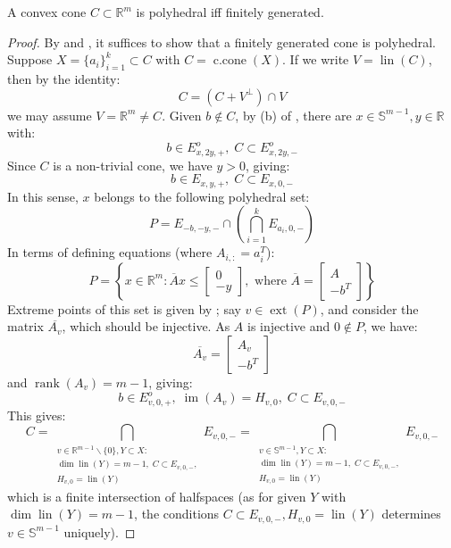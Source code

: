 \begin{prop}\label{prop:017-Minkowski-Weyl-Theorem}
	A convex cone $C\subset \mathbb{R}^m$ is polyhedral iff finitely generated.
\end{prop}
\begin{proof}
	By  and , it suffices to show that a finitely generated cone is polyhedral. Suppose $X=\{a_i\}_{i=1}^{k}\subset C$ with $C=\operatorname{c.cone}(X)$. If we write $V=\operatorname{lin}(C)$, then by the identity:
	\[
		C=(C+V^\perp)\cap V
	\]
	we may assume $V=\mathbb{R}^m\neq C$. Given $b\notin C$, by (b) of , there are $x\in \mathbb{S}^{m-1},y\in \mathbb{R}$ with:
	\[
		b\in E_{x,2y,+}^o,\; C\subset E_{x,2y,-}^o
	\]
	Since $C$ is a non-trivial cone, we have $y>0$, giving:
	\[
		b\in E_{x,y,+},\; C\subset E_{x,0,-}
	\]
	In this sense, $x$ belongs to the following polyhedral set:
	\[
		P = E_{-b,-y,-}\cap\left(\bigcap_{i=1}^k E_{a_i,0,-}\right)
	\]
	In terms of defining equations (where $A_{i,:}=a_i^T$):
	\[
		P=
		\left\{x\in \mathbb{R}^m:\overline{A}x\leq
		\left[
			\begin{array}{r}
				0 \\\hline
				-y
			\end{array}
			\right]
		,\text{ where }
		\overline{A}=\left[
			\begin{array}{r}
				A \\\hline
				-b^T
			\end{array}
			\right]
		\right\}
	\]
	Extreme points of this set is given by ; say $v\in \operatorname{ext}(P)$, and consider the matrix $\overline{A_v}$, which should be injective. As $A$ is injective and $0\notin P$, we have:
	\[
		\overline{A_v}=
		\left[
			\begin{array}{r}
				A_v \\\hline
				-b^T
			\end{array}
			\right]
	\]
	and $\operatorname{rank}(A_v)=m-1$, giving:
	\[
		b\in E^o_{v,0,+},\; \operatorname{im}(A_v)=H_{v,0},\; C\subset E_{v,0,-}
	\]
	This gives:
	\[
		C = \bigcap_{\substack{
				v\in \mathbb{R}^{m-1}\smallsetminus\{0\},Y\subset X:\\
				\dim \operatorname{lin}(Y)=m-1,\;C\subset E_{v,0,-},\\
				H_{v,0}=\operatorname{lin}(Y)
			}
		}E_{v,0,-}=
		\bigcap_{\substack{
				v\in \mathbb{S}^{m-1},Y\subset X:\\
				\dim \operatorname{lin}(Y)=m-1,\;C\subset E_{v,0,-},\\
				H_{v,0}=\operatorname{lin}(Y)
			}
		}E_{v,0,-}
	\]
	which is a finite intersection of halfspaces (as for given $Y$ with $\operatorname{dim}\operatorname{lin}(Y)=m-1$, the conditions $C\subset E_{v,0,-},H_{v,0}=\operatorname{lin}(Y)$ determines $v\in \mathbb{S}^{m-1}$ uniquely).
\end{proof}

